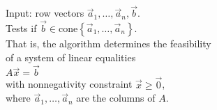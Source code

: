 \documentclass[preview]{standalone}
\begin{document}
\begin{center}
Input: row vectors $\vec{a}_1,\ldots,\vec{a}_n, \vec{b}$.\\Tests if $\vec{b}\in\text{cone}\left\lbrace\vec{a}_1,\ldots,\vec{a}_n\right\rbrace$.\\That is, the algorithm determines the feasibility\\of a system of linear equalities\\$A\vec{x}=\vec{b}$\\with nonnegativity constraint $\vec{x}\geq\vec{0}$,\\where $\vec{a}_1,\ldots,\vec{a}_n$ are the columns of $A$.
\end{center}
\end{document}
